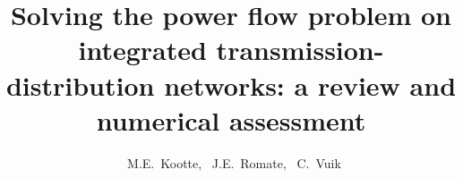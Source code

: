 \documentclass[10pt,journal]{article}
\begin{document}
%
\title{Solving the power flow problem on integrated transmission-distribution networks: a review and numerical assessment}
%
%

\author{~M.E.~Kootte,%
        ~J.E.~Romate,
        ~C.~Vuik%
}

% 
%
\end{document}
